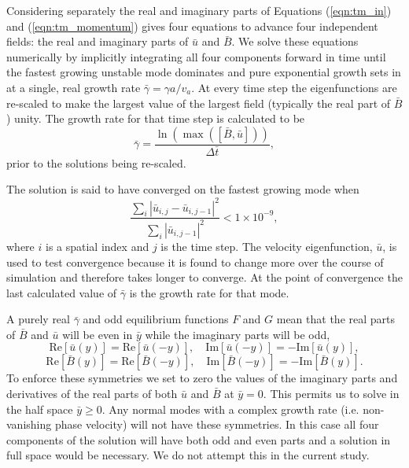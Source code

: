 	Considering separately the real and imaginary parts of Equations (\ref{eqn:tm_in}) and (\ref{eqn:tm_momentum}) gives four equations to advance four independent fields: the real and imaginary parts of $\bar{u}$ and $\bar{B}$. We solve these equations numerically by implicitly integrating all four components forward in time until the fastest growing unstable mode dominates and pure exponential growth sets in at a single, real growth rate $\bar{\gamma}=\gamma a/v_a$. At every time step the eigenfunctions are re-scaled to make the largest value of the largest field (typically the real part of $\bar{B}$) unity. The growth rate for that time step is calculated to be
	\begin{equation}
	\bar{\gamma} = \frac{\ln(\max([\bar{B},\bar{u}]))}{\Delta \bar{t}},
\end{equation}	
prior to the solutions being re-scaled.	
	 
	 The solution is said to have converged on the fastest growing mode when
	\begin{equation}
	\frac{\sum_i |\bar{u}_{i,j}-\bar{u}_{i,j-1}|^2}{\sum_i |\bar{u}_{i,j-1}|^2} < 1 \times 10^{-9},
	\end{equation}
where $i$ is a spatial index and $j$ is the time step. The velocity eigenfunction, $\bar{u}$, is used to test convergence because it is found to change more over the course of simulation and therefore takes longer to converge. At the point of convergence the last calculated value of $\bar{\gamma}$ is the growth rate for that mode.
	
		A purely real $\bar{\gamma}$ and odd equilibrium functions $F$ and $G$ mean that the real parts of $\bar{B}$ and $\bar{u}$ will be even in $\bar{y}$ while the imaginary parts will be odd,
	\begin{equation}
	\mathrm{Re}[\bar{u}(y)] = \mathrm{Re}[\bar{u}(-y)], \quad \mathrm{Im}[\bar{u}(-y)] = -\mathrm{Im}[\bar{u}(y)],
	\end{equation}
	\begin{equation}
	 \mathrm{Re}[\bar{B}(y)] = \mathrm{Re}[\bar{B}(-y)], \quad \mathrm{Im}[\bar{B}(-y)] = -\mathrm{Im}[\bar{B}(y)].
	\end{equation}
	To enforce these symmetries we set to zero the values of the imaginary parts and derivatives of the real parts of both $\bar{u}$ and $\bar{B}$ at $\bar{y}=0$. This permits us to solve in the half space $\bar{y}  \geq 0$.  Any normal modes with a complex growth rate (i.e. non-vanishing phase velocity) will not have these symmetries.  In this case all four components of the solution will have both odd and even parts and a solution in full space would be necessary. We do not attempt this in the current study. 
	  

